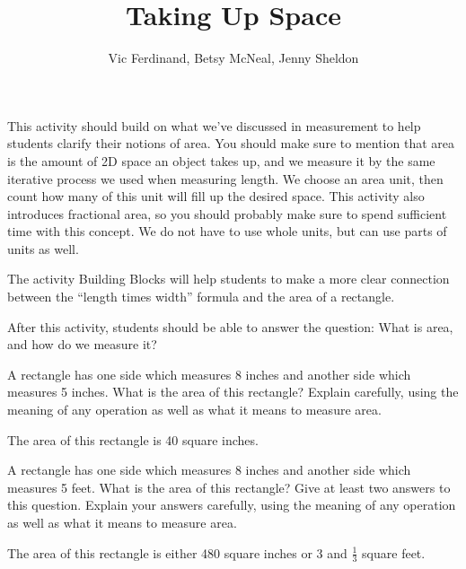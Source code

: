 \documentclass{ximera}
\title{Taking Up Space}
\author{Vic Ferdinand, Betsy McNeal, Jenny Sheldon}
\begin{document}
\begin{abstract}
\end{abstract}
\maketitle

\begin{instructorIntro}
This activity should build on what we've discussed in measurement to help students clarify their notions of area.  You should make sure to mention that area is the amount of 2D space an object takes up, and we measure it by the same iterative process we used when measuring length.  We choose an area unit, then count how many of this unit will fill up the desired space.  This activity also introduces fractional area, so you should probably make sure to spend sufficient time with this concept.  We do not have to use whole units, but can use parts of units as well.

The activity Building Blocks will help students to make a more clear connection between the ``length times width'' formula and the area of a rectangle.  

After this activity, students should be able to answer the question: What is area, and how do we measure it?
\end{instructorIntro}

\begin{problem}
A rectangle has one side which measures 8 inches and another side which measures 5 inches.  What is the area of this rectangle?  Explain carefully, using the meaning of any operation as well as what it means to measure area.

\begin{solution}
The area of this rectangle is 40 square inches.
\end{solution}
\end{problem}

\begin{problem}
A rectangle has one side which measures 8 inches and another side which measures 5 feet.  What is the area of this rectangle?  Give at least two answers to this question.  Explain your answers carefully, using the meaning of any operation as well as what it means to measure area.

\begin{solution}
The area of this rectangle is either 480 square inches or 3 and $\frac13$ square feet.
\end{solution}
\end{problem}
\end{document}
